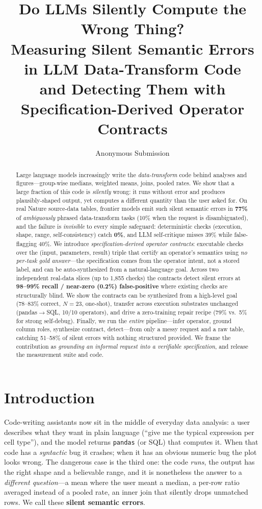 \documentclass[10pt,twocolumn,letterpaper]{article}
\title{Do LLMs Silently Compute the Wrong Thing?\\[2pt]
Measuring Silent Semantic Errors in LLM Data-Transform Code\\
and Detecting Them with Specification-Derived Operator Contracts}
\author{Anonymous Submission}
\date{}
\begin{document}
\maketitle

\begin{abstract}
Large language models increasingly write the \emph{data-transform} code behind
analyses and figures---group-wise medians, weighted means, joins, pooled rates.
We show that a large fraction of this code is \emph{silently} wrong: it runs
without error and produces plausibly-shaped output, yet computes a different
quantity than the user asked for. On real Nature source-data tables, frontier
models emit such silent semantic errors in \textbf{77\%} of \emph{ambiguously}
phrased data-transform tasks (10\% when the request is disambiguated), and the
failure is \emph{invisible} to every simple safeguard: deterministic checks
(execution, shape, range, self-consistency) catch \textbf{0\%}, and LLM
self-critique misses 39\% while false-flagging 40\%. We introduce
\emph{specification-derived operator contracts}: executable checks over the
(input, parameters, result) triple that certify an operator's semantics using
\emph{no per-task gold answer}---the specification comes from the operator
intent, not a stored label, and can be auto-synthesized from a natural-language
goal. Across two independent real-data slices (up to 1{,}855 checks) the
contracts detect silent errors at \textbf{98--99\% recall / near-zero
(0.2\%) false-positive} where existing checks are structurally blind. We show the contracts can be
synthesized from a high-level goal (78--83\% correct, $N{=}23$, one-shot),
transfer across execution substrates unchanged (pandas${\to}$SQL, 10/10
operators), and drive a zero-training repair recipe (79\% vs.\ 5\% for strong
self-debug). Finally, we run the \emph{entire} pipeline---infer operator, ground
column roles, synthesize contract, detect---from only a messy request and a raw
table, catching 51--58\% of silent errors with nothing structured provided. We
frame the contribution as \emph{grounding an informal request into a
verifiable specification}, and release the measurement suite and code.
\end{abstract}

\section{Introduction}
Code-writing assistants now sit in the middle of everyday data analysis: a user
describes what they want in plain language (``give me the typical expression per
cell type''), and the model returns \texttt{pandas} (or SQL) that computes it.
When that code has a \emph{syntactic} bug it crashes; when it has an obvious
numeric bug the plot looks wrong. The dangerous case is the third one: the code
\emph{runs}, the output has the right shape and a believable range, and it is
nonetheless the answer to a \emph{different question}---a mean where the user
meant a median, a per-row ratio averaged instead of a pooled rate, an inner join
that silently drops unmatched rows. We call these \textbf{silent semantic
errors}.
\end{document}
